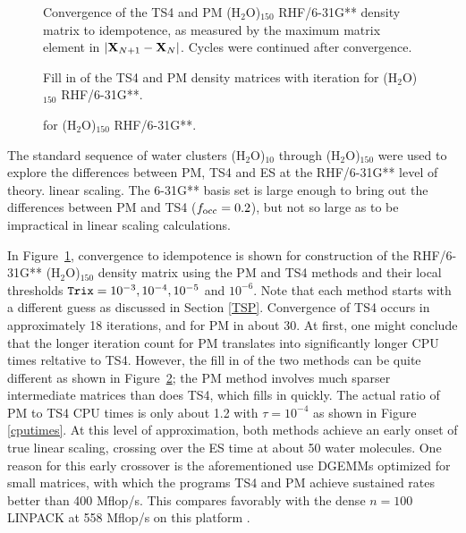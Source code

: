 \commentoutA{\documentclass[prb,aps,twocolumn,twocolumngrid,secnumarabic,superbib,hyperref]{revtex4}}
\begin{document}
\begin{figure}[t]
\caption{Convergence of the TS4 and PM  (H$_2$O)$_{150}$ RHF/6-31G** 
density matrix to idempotence, as measured by the maximum matrix element in 
$|{\bf X}_{N+1}-{\bf X}_N|$. Cycles were continued after convergence.}\label{waterconvergence}
\end{figure}

\begin{figure}[t]
\caption{Fill in of the TS4 and PM density matrices with iteration
for (H$_2$O)$_{150}$ RHF/6-31G**.} \label{fillin}
\end{figure}

\begin{figure}[t]
\caption{for (H$_2$O)$_{150}$ RHF/6-31G**.} \label{EigenBounds}
\end{figure}

The standard sequence of water clusters (H$_2$O)$_{10}$ through (H$_2$O)$_{150}$ 
were used to explore the differences between PM, TS4 and ES at the RHF/6-31G** level of theory.  
linear scaling.  The 6-31G** basis set is large enough to bring out the differences between PM and TS4 
($f_{\rm occ}=0.2$), but not so large as to be impractical in linear scaling calculations.  

In Figure~\ref{waterconvergence}, convergence to idempotence is shown for 
construction of the  RHF/6-31G** (H$_2$O)$_{150}$ density matrix using the PM and TS4 methods
and their local thresholds ${\tt Trix}=10^{-3}, 10^{-4}, 10^{-5}$ and $10^{-6}$. 
Note that each method starts with a different guess as discussed in Section \ref{TSP}.  Convergence
of TS4 occurs in approximately 18 iterations, and for PM in about 30.  At first, 
one might conclude that the longer iteration count for PM translates into significantly 
longer CPU times reltative to TS4.  However, the fill in of the two methods
can be quite different as shown in Figure~\ref{fillin};  the PM method involves much
sparser intermediate matrices than does TS4, which fills in quickly.  The actual ratio
of PM to TS4 CPU times is only about 1.2 with $\tau=10^{-4}$ as shown in 
Figure \ref{cputimes}.  At this level of approximation, both methods achieve 
an early onset of true linear scaling, crossing  over the ES time at about 50 water 
molecules.  One reason for this early crossover is the aforementioned use 
{\sc DGEMM}s optimized for small matrices, with which the programs {\sc TS4} and {\sc PM} achieve sustained
rates better than 400 Mflop/s.  This compares favorably with the dense $n=100$
{\sc LINPACK} at 558 Mflop/s on this platform \cite{JDongarra01}.
\end{document}
